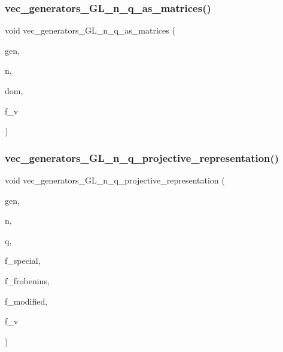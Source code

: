 \subsubsection{\texorpdfstring{vec\+\_\+generators\+\_\+\+G\+L\+\_\+n\+\_\+q\+\_\+as\+\_\+matrices()}{vec\_generators\_GL\_n\_q\_as\_matrices()}}
{\footnotesize\ttfamily void vec\+\_\+generators\+\_\+\+G\+L\+\_\+n\+\_\+q\+\_\+as\+\_\+matrices (\begin{DoxyParamCaption}\item[{\mbox{\hyperlink{class_vector}{Vector}} \&}]{gen,  }\item[{\mbox{\hyperlink{galois_8h_a09fddde158a3a20bd2dcadb609de11dc}{I\+NT}}}]{n,  }\item[{\mbox{\hyperlink{classdomain}{domain}} $\ast$}]{dom,  }\item[{\mbox{\hyperlink{galois_8h_a09fddde158a3a20bd2dcadb609de11dc}{I\+NT}}}]{f\+\_\+v }\end{DoxyParamCaption})}

\mbox{\label{perm__group__gens_8_c_ae56b1d99562cb32203518575c689746d}} 
\subsubsection{\texorpdfstring{vec\+\_\+generators\+\_\+\+G\+L\+\_\+n\+\_\+q\+\_\+projective\+\_\+representation()}{vec\_generators\_GL\_n\_q\_projective\_representation()}}
{\footnotesize\ttfamily void vec\+\_\+generators\+\_\+\+G\+L\+\_\+n\+\_\+q\+\_\+projective\+\_\+representation (\begin{DoxyParamCaption}\item[{\mbox{\hyperlink{class_vector}{Vector}} \&}]{gen,  }\item[{\mbox{\hyperlink{galois_8h_a09fddde158a3a20bd2dcadb609de11dc}{I\+NT}}}]{n,  }\item[{\mbox{\hyperlink{galois_8h_a09fddde158a3a20bd2dcadb609de11dc}{I\+NT}}}]{q,  }\item[{\mbox{\hyperlink{galois_8h_a09fddde158a3a20bd2dcadb609de11dc}{I\+NT}}}]{f\+\_\+special,  }\item[{\mbox{\hyperlink{galois_8h_a09fddde158a3a20bd2dcadb609de11dc}{I\+NT}}}]{f\+\_\+frobenius,  }\item[{\mbox{\hyperlink{galois_8h_a09fddde158a3a20bd2dcadb609de11dc}{I\+NT}}}]{f\+\_\+modified,  }\item[{\mbox{\hyperlink{galois_8h_a09fddde158a3a20bd2dcadb609de11dc}{I\+NT}}}]{f\+\_\+v }\end{DoxyParamCaption})}

